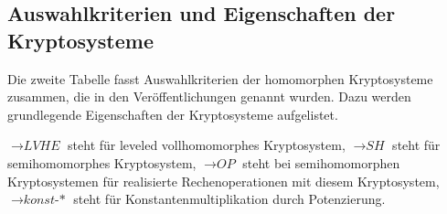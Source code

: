 \subsection{Auswahlkriterien und Eigenschaften der Kryptosysteme}

Die zweite Tabelle fasst Auswahlkriterien der homomorphen Kryptosysteme zusammen, die in den Veröffentlichungen genannt wurden. Dazu werden grundlegende Eigenschaften der Kryptosysteme aufgelistet.

$\rightarrow\textit{LVHE}$ steht für leveled vollhomomorphes Kryptosystem, $\rightarrow\textit{SH}$ steht für semihomomorphes Kryptosystem, $\rightarrow\textit{OP}$ steht bei semihomomorphen Kryptosystemen für realisierte Rechenoperationen mit diesem Kryptosystem, $\rightarrow\textit{konst-*}$ steht für Konstantenmultiplikation durch Potenzierung.


